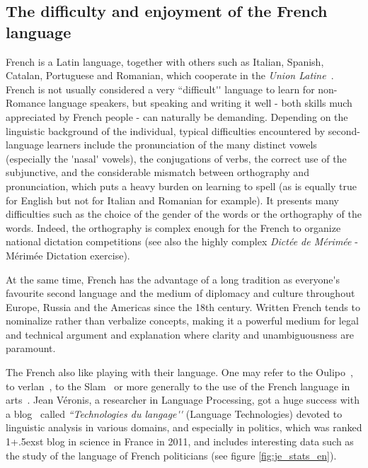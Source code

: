 \begin{multicols}{2}
\subsection{The difficulty and enjoyment of the French language}
French is a Latin language, together with others such as Italian,
Spanish, Catalan, Portuguese and Romanian, which cooperate in the
{\em Union Latine}~\cite{ulatine}. French is not usually considered a very ``difficult{\mbox '}{\mbox '}
language to learn for non-Romance language speakers, but speaking and
writing it well - both skills much appreciated by French people - can
naturally be demanding. Depending on the linguistic background of the
individual, typical difficulties encountered by second-language
learners include the pronunciation of the many distinct vowels
(especially the {\mbox '}nasal{\mbox '} vowels), the conjugations of verbs, the
correct use of the subjunctive, and the considerable mismatch between
orthography and pronunciation, which puts a heavy burden on learning
to spell (as is equally true for English but not for Italian and
Romanian for example). It presents many difficulties such as the
choice of the gender of the words or the orthography of the
words. Indeed, the orthography is complex enough for the French to
organize national dictation competitions (see also the highly complex
{\em Dictée de Mérimée} - Mérimée Dictation exercise).  

At the same time, French has the advantage of a long tradition as
everyone{\mbox '}s favourite second language and the medium of diplomacy and
culture throughout Europe, Russia and the Americas since the 18th
century. Written French tends to nominalize rather than verbalize
concepts, making it a powerful medium for legal and technical argument
and explanation where clarity and unambiguousness are paramount.

The French also like playing with their language. One may refer to the
Oulipo~\cite{oulipo}, to verlan~\cite{plenat95}, to the Slam~\cite{slam} or more generally to the use of the
French language in arts~\cite{arts}. Jean Véronis, a researcher in Language
Processing, got a huge success with a blog~\cite{veronis} called {\em ``Technologies du
langage{\mbox '}{\mbox '}} (Language Technologies) devoted to linguistic analysis in various domains, and
especially in politics, which was ranked 1\raise+.5ex\hbox{st} blog in science in France
in 2011, and includes interesting data such as the study of the
language of French politicians (see figure \ref{fig:je_stats_en}).


\end{multicols}
